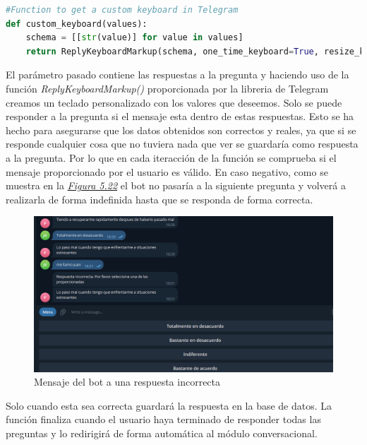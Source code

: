 \begin{lstlisting}[language=Python]
#Function to get a custom keyboard in Telegram
def custom_keyboard(values):
    schema = [[str(value)] for value in values]
    return ReplyKeyboardMarkup(schema, one_time_keyboard=True, resize_keyboard=True)
\end{lstlisting}

El parámetro pasado contiene las respuestas a la pregunta y haciendo uso de la función \textit{ReplyKeyboardMarkup()} proporcionada por la libreria de Telegram creamos un teclado personalizado con los valores que deseemos. Solo se puede responder a la pregunta si el mensaje esta dentro de estas respuestas. Esto se ha hecho para asegurarse que los datos obtenidos son correctos y reales, ya que si se responde cualquier cosa que no tuviera nada que ver se guardaría como respuesta a la pregunta. Por lo que en cada iteracción de la función se comprueba si el mensaje proporcionado por el usuario es válido. En caso negativo, como se muestra en la \textit{\hyperref[fig:wrong]{Figura 5.22}} el bot no pasaría a la siguiente pregunta y volverá a realizarla de forma indefinida hasta que se responda de forma correcta. \vspace{0.5cm}

\begin{figure}[!ht]
    \centering
    \includegraphics[width=1\textwidth]{imagenes/pregunta_incorrecta.png}
    \caption{ Mensaje del bot a una respuesta incorrecta }
    \label{fig:wrong}
\end{figure}\vspace{0.3cm}

Solo cuando esta sea correcta guardará la respuesta en la base de datos. La función finaliza cuando el usuario haya terminado de responder todas las preguntas y lo redirigirá de forma automática al módulo conversacional.

